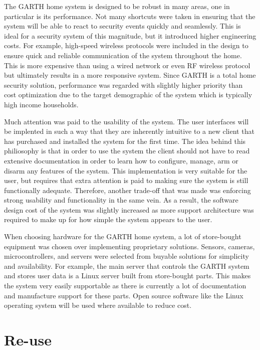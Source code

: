 \documentclass{report}
\begin{document}
The GARTH home system is designed to be robust in many areas, one in particular
is its performance. Not many shortcuts were taken in ensuring that the system
will be able to react to security events quickly and seamlessly. This is ideal
for a security system of this magnitude, but it introduced higher engineering
costs. For example, high-speed wireless protocols were included in the design
to ensure quick and reliable communication of the system throughout the home.
This is more expensive than using a wired network or even RF wireless protocol
but ultimately results in a more responsive system. Since GARTH is a total home
security solution, performance was regarded with slightly higher priority than
cost optimization due to the target demographic of the system which is
typically high income households.

Much attention was paid to the usability of the system. The user interfaces
will be implented in such a way that they are inherently intuitive to a new
client that has purchased and installed the system for the first time. The idea
behind this philiosophy is that in order to use the system the client should
not have to read extensive documentation in order to learn how to configure,
manage, arm or disarm any features of the system. This implementation is very
suitable for the user, but requires that extra attention is paid to making sure
the system is still functionally adequate. Therefore, another trade-off that
was made was enforcing strong usability and functionality in the same vein. As
a result, the software design cost of the system was slightly increased as more
support architecture was required to make up for how simple the system appears
to the user.

When choosing hardware for the GARTH home system, a lot of store-bought
equipment was chosen over implementing proprietary solutions. Sensors, cameras,
microcontrollers, and servers were selected from buyable solutions for
simplicity and availability. For example, the main server that controls the
GARTH system and stores user data is a Linux server built from store-bought
parts.  This makes the system very easily supportable as there is currently a
lot of documentation and manufacture support for these parts. Open source
software like the Linux operating system will be used where available to reduce
cost.

\section{Re-use}
\end{document}

